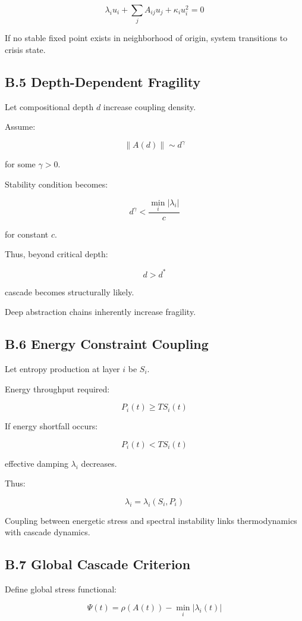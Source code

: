 \documentclass[11pt,openany]{book}
\begin{document}
\[
\lambda_i u_i
+
\sum_j A_{ij} u_j
+
\kappa_i u_i^2
= 0
\]

If no stable fixed point exists in neighborhood of origin,
system transitions to crisis state.

\subsection{B.5 Depth-Dependent Fragility}

Let compositional depth $d$ increase coupling density.

Assume:

\[
\|A(d)\| \sim d^\gamma
\]

for some $\gamma > 0$.

Stability condition becomes:

\[
d^\gamma < \frac{\min_i |\lambda_i|}{c}
\]

for constant $c$.

Thus, beyond critical depth:

\[
d > d^*
\]

cascade becomes structurally likely.

Deep abstraction chains inherently increase fragility.

\subsection{B.6 Energy Constraint Coupling}

Let entropy production at layer $i$ be $S_i$.

Energy throughput required:

\[
P_i(t) \ge T S_i(t)
\]

If energy shortfall occurs:

\[
P_i(t) < T S_i(t)
\]

effective damping $\lambda_i$ decreases.

Thus:

\[
\lambda_i = \lambda_i(S_i, P_i)
\]

Coupling between energetic stress and spectral instability links 
thermodynamics with cascade dynamics.

\subsection{B.7 Global Cascade Criterion}

Define global stress functional:

\[
\Psi(t) = \rho(A(t)) - \min_i |\lambda_i(t)|
\]
\end{document}
